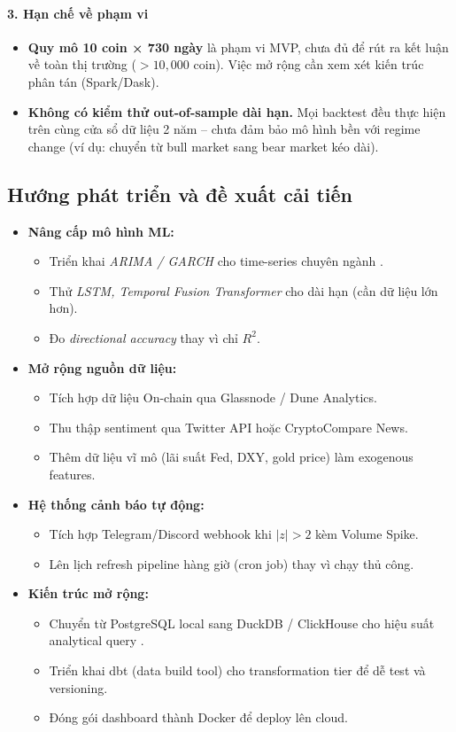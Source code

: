 \paragraph{3. Hạn chế về phạm vi}
\begin{itemize}
    \item \textbf{Quy mô 10 coin × 730 ngày} là phạm vi MVP, chưa đủ để rút ra kết luận về toàn thị trường ($>10{,}000$ coin). Việc mở rộng cần xem xét kiến trúc phân tán (Spark/Dask).
    \item \textbf{Không có kiểm thử out-of-sample dài hạn.} Mọi backtest đều thực hiện trên cùng cửa sổ dữ liệu 2 năm -- chưa đảm bảo mô hình bền với regime change (ví dụ: chuyển từ bull market sang bear market kéo dài).
\end{itemize}

\subsection{Hướng phát triển và đề xuất cải tiến}
\begin{itemize}
    \item \textbf{Nâng cấp mô hình ML:}
    \begin{itemize}
        \item Triển khai \emph{ARIMA / GARCH} cho time-series chuyên ngành \cite{hyndman2021}.
        \item Thử \emph{LSTM, Temporal Fusion Transformer} cho dài hạn (cần dữ liệu lớn hơn).
        \item Đo \emph{directional accuracy} thay vì chỉ $R^2$.
    \end{itemize}
    \item \textbf{Mở rộng nguồn dữ liệu:}
    \begin{itemize}
        \item Tích hợp dữ liệu On-chain qua Glassnode / Dune Analytics.
        \item Thu thập sentiment qua Twitter API hoặc CryptoCompare News.
        \item Thêm dữ liệu vĩ mô (lãi suất Fed, DXY, gold price) làm exogenous features.
    \end{itemize}
    \item \textbf{Hệ thống cảnh báo tự động:}
    \begin{itemize}
        \item Tích hợp Telegram/Discord webhook khi $|z| > 2$ kèm Volume Spike.
        \item Lên lịch refresh pipeline hàng giờ (cron job) thay vì chạy thủ công.
    \end{itemize}
    \item \textbf{Kiến trúc mở rộng:}
    \begin{itemize}
        \item Chuyển từ PostgreSQL local sang DuckDB / ClickHouse cho hiệu suất analytical query \cite{silberschatz2019}.
        \item Triển khai dbt (data build tool) cho transformation tier để dễ test và versioning.
        \item Đóng gói dashboard thành Docker để deploy lên cloud.
    \end{itemize}
\end{itemize}
